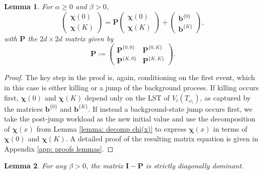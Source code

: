\documentclass[reqno,12pt]{amsart}
\newcommand{\bs}{\boldsymbol}
\newtheorem{lemma}{Lemma}
\begin{document}
\begin{lemma}\label{lemma: decomp chi(0) and chi(K)}
    For $\alpha\geqslant0$ and $\beta>0$,
    \begin{equation*}
        \left(\begin{array}{c} {\bs \chi}(0) \\ {\bs \chi}(K)\end{array} \right)= {\bs P}\left(\begin{array}{c} {\bs \chi}(0) \\ {\bs \chi}(K)\end{array} \right) + 
        \left(\begin{array}{c} {\bs b}^{\{0\}} \\ {\bs b}^{\{K\}}\end{array} \right),
    \end{equation*}
    with ${\bs P}$ the $2d\times 2d$ matrix given by
    \begin{equation*}
        {\bs P}:=\left(\begin{array}{cc} {\bs P}^{\{0,0\}}&{\bs P}^{\{0,K\}}\\{\bs P}^{\{K,0\}}&{\bs P}^{\{K,K\}}\end{array}\right).
    \end{equation*}
\end{lemma}
\begin{proof}
    The key step in the proof is, again, conditioning on the first event, which in this case is either killing or a jump of the background process. If killing occurs first, ${\bs \chi}(0)$ and ${\bs \chi}(K)$ depend only on the LST of $V_i(T_{\omega_i})$, as captured by the matrices ${\bs b}^{\{0\}}$ and ${\bs b}^{\{K\}}$. If instead a background-state jump occurs first, we take the post-jump workload as the new initial value and use the decomposition of ${\bs \chi}(x)$ from Lemma \ref{lemma: decomp chi(x)} to express ${\bs \chi}(x)$ in terms of ${\bs \chi}(0)$ and ${\bs \chi}(K)$. A detailed proof of the resulting matrix equation is given in Appendix \ref{app: proofs lemmas}.
\end{proof}
\begin{lemma}\label{lemma: diagdom}
    For any $\beta>0$, the matrix ${\bs I}-{\bs P}$ is strictly diagonally dominant.
\end{lemma}
\end{document}

